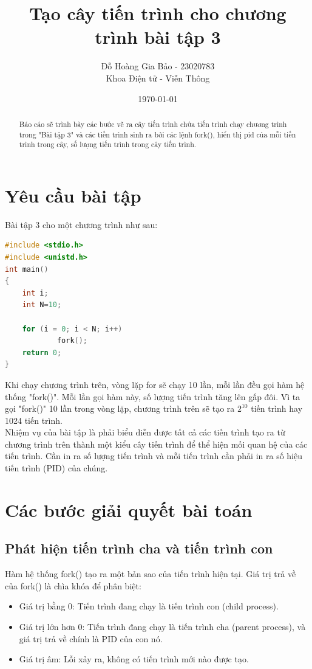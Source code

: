 \documentclass[12pt, letterpaper]{article}
\title{Tạo cây tiến trình cho chương trình bài tập 3}
\author{Đỗ Hoàng Gia Bảo - 23020783 \\ \small Khoa Điện tử - Viễn Thông}
\date{\today}
\begin{document}
\maketitle

\begin{abstract}
Báo cáo sẽ trình bày các bước vẽ ra cây tiến trình chứa tiến trình chạy chương trình trong "Bài tập 3" và các tiến trình sinh ra bởi các lệnh fork(), hiển thị pid của mỗi tiến trình trong cây, số lượng tiến trình trong cây tiến trình.
\end{abstract}
\newpage
\tableofcontents

\newpage
{}
\setcounter{page}{3} %

\section{Yêu cầu bài tập}
Bài tập 3 cho một chương trình như sau:

\begin{lstlisting}[language=C, caption={Nội dung file C của bài tập}, label={lst:main}]
#include <stdio.h>
#include <unistd.h>
int main()
{
    int i;
    int N=10;

    for (i = 0; i < N; i++)
            fork();
    return 0;
}
\end{lstlisting}

\noindent Khi chạy chương trình trên, vòng lặp for sẽ chạy 10 lần, mỗi lần đều gọi hàm hệ thống "fork()". Mỗi lần gọi hàm này, số lượng tiến trình tăng lên gấp đôi. Vì ta gọi "fork()" 10 lần trong vòng lặp, chương trình trên sẽ tạo ra $2^{10}$ tiến trình hay 1024 tiến trình.\\
Nhiệm vụ của bài tập là phải biểu diễn được tất cả các tiến trình tạo ra từ chương trình trên thành một kiểu cây tiến trình để thể hiện mối quan hệ của các tiến trình. Cần in ra số lượng tiến trình và mỗi tiến trình cần phải in ra số hiệu tiến trình (PID) của chúng.

\section{Các bước giải quyết bài toán}
\subsection{Phát hiện tiến trình cha và tiến trình con}
Hàm hệ thống fork() tạo ra một bản sao của tiến trình hiện tại. Giá trị trả về của fork() là chìa khóa để phân biệt:
\begin{itemize}
\item Giá trị bằng 0: Tiến trình đang chạy là tiến trình con (child process).
\item Giá trị lớn hơn 0: Tiến trình đang chạy là tiến trình cha (parent process), và giá trị trả về chính là PID của con nó.
\item Giá trị âm: Lỗi xảy ra, không có tiến trình mới nào được tạo.
\end{itemize}
\end{document}
